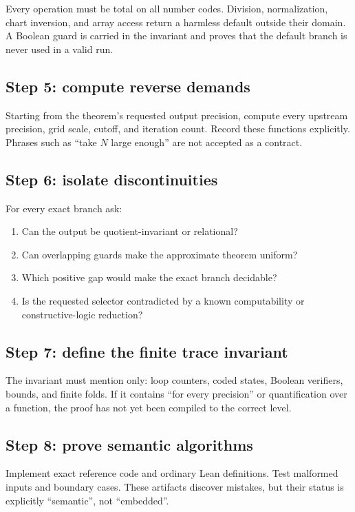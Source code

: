Every operation must be total on all number codes.  Division, normalization,
chart inversion, and array access return a harmless default outside their
domain.  A Boolean guard is carried in the invariant and proves that the
default branch is never used in a valid run.

\subsection{Step 5: compute reverse demands}

Starting from the theorem's requested output precision, compute every
upstream precision, grid scale, cutoff, and iteration count.  Record these
functions explicitly.  Phrases such as ``take \(N\) large enough'' are not
accepted as a contract.

\subsection{Step 6: isolate discontinuities}

For every exact branch ask:
\begin{enumerate}[label=(\alph*)]
\item Can the output be quotient-invariant or relational?
\item Can overlapping guards make the approximate theorem uniform?
\item Which positive gap would make the exact branch decidable?
\item Is the requested selector contradicted by a known computability or
      constructive-logic reduction?
\end{enumerate}

\subsection{Step 7: define the finite trace invariant}

The invariant must mention only:
loop counters, coded states, Boolean verifiers, bounds, and finite folds.
If it contains ``for every precision'' or quantification over a function, the
proof has not yet been compiled to the correct level.

\subsection{Step 8: prove semantic algorithms}

Implement exact reference code and ordinary Lean definitions.  Test malformed
inputs and boundary cases.  These artifacts discover mistakes, but their
status is explicitly ``semantic'', not ``embedded''.

